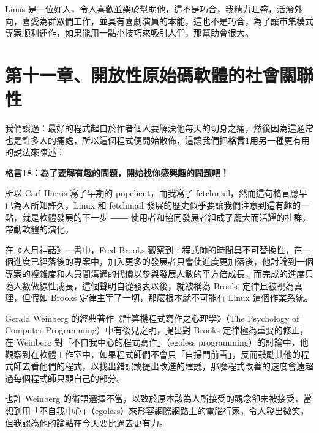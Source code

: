 \documentclass[12pt, a5paper]{book}
\begin{document}
Linus
是一位好人，令人喜歡並樂於幫助他，這不是巧合，我精力旺盛，活潑外向，喜愛為群眾們工作，並具有喜劇演員的本能，這也不是巧合，為了讓市集模式專案順利運作，如果能用一點小技巧來吸引人們，那幫助會很大。

\newpage
\section{第十一章、開放性原始碼軟體的社會關聯性}\label{ux7b2cux5341ux4e00ux7ae0ux958bux653eux6027ux539fux59cbux78bcux8edfux9ad4ux7684ux793eux6703ux95dcux806fux6027}

我們談過︰最好的程式起自於作者個人要解決他每天的切身之痛，然後因為這通常也是許多人的痛處，所以這個程式便開始散佈，這讓我們把\textbf{格言1}用另一種更有用的說法來陳述︰

\textbf{格言18︰為了要解有趣的問題，開始找你感興趣的問題吧！}

所以 Carl Harris 寫了早期的 popclient，而我寫了
fetchmail，然而這句格言應早已為人所知許久，Linux 和 fetchmail
發展的歷史似乎要讓我們注意到這有趣的一點，就是軟體發展的下一步 ――
使用者和協同發展者組成了龐大而活耀的社群，帶動軟體的演化。

在《人月神話》一書中，Fred Brooks
觀察到︰程式師的時間具不可替換性，在一個進度已經落後的專案中，加入更多的發展者只會使進度更加落後，他討論到一個專案的複雜度和人員間溝通的代價以參與發展人數的平方倍成長，而完成的進度只隨人數做線性成長，這個聲明自從發表以後，就被稱為
Brooks 定律且被視為真理，但假如 Brooks
定律主宰了一切，那麼根本就不可能有 Linux 這個作業系統。

Gerald Weinberg 的經典著作《計算機程式寫作之心理學》（The Psychology of
Computer Programming）中有後見之明，提出對 Brooks 定律極為重要的修正，在
Weinberg 對「不自我中心的程式寫作」（egoless
programming）的討論中，他觀察到在軟體工作室中，如果程式師們不會只「自掃門前雪」，反而鼓勵其他的程式師去看他們的程式，以找出錯誤或提出改進的建議，那麼程式改善的速度會遠超過每個程式師只顧自己的部分。

也許 Weinberg
的術語選擇不當，以致於原本該為人所接受的觀念卻未被接受，當想到用「不自我中心」（egoless）來形容網際網路上的電腦行家，令人發出微笑，但我認為他的論點在今天要比過去更有力。
\end{document}
